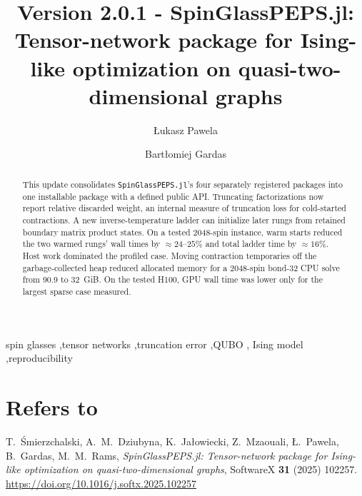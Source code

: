 \documentclass[preprint,12pt,a4paper]{elsarticle}
\begin{document}
\begin{frontmatter}

\title{Version 2.0.1 - SpinGlassPEPS.jl: Tensor-network package for
Ising-like optimization on quasi-two-dimensional graphs}

\author[iitis]{\L{}ukasz Pawela}
\author[iitis]{Bart\l{}omiej Gardas}


\address[iitis]{Institute of Theoretical and Applied Informatics, Polish Academy
of Sciences, Ba\l{}tycka 5, 44-100 Gliwice, Poland}

\begin{abstract}
This update consolidates \texttt{SpinGlassPEPS.jl}'s four separately registered
packages into one installable package with a defined public API. Truncating
factorizations now report relative discarded weight, an internal measure of
truncation loss for cold-started contractions. A new inverse-temperature ladder
can initialize later rungs from retained boundary matrix product states. On a
tested 2048-spin instance, warm starts reduced the two warmed rungs' wall times
by ${\approx}24$--$25\%$ and total ladder time by $\approx16\%$. Host work
dominated the profiled case. Moving contraction temporaries off the
garbage-collected heap reduced allocated memory for a 2048-spin bond-32 CPU solve
from 90.9 to 32~GiB. On the tested H100, GPU wall time was lower only for the
largest sparse case measured.
\end{abstract}

\begin{keyword}
spin glasses \sep tensor networks \sep truncation error \sep QUBO \sep
Ising model \sep reproducibility
\end{keyword}

\end{frontmatter}

\section*{Refers to}

T.~\'Smierzchalski, A.~M.~Dziubyna, K.~Ja\l{}owiecki, Z.~Mzaouali, \L{}.~Pawela,
B.~Gardas, M.~M.~Rams, \emph{SpinGlassPEPS.jl: Tensor-network package for
Ising-like optimization on quasi-two-dimensional graphs}, SoftwareX \textbf{31}
(2025) 102257. \url{https://doi.org/10.1016/j.softx.2025.102257}
\end{document}
